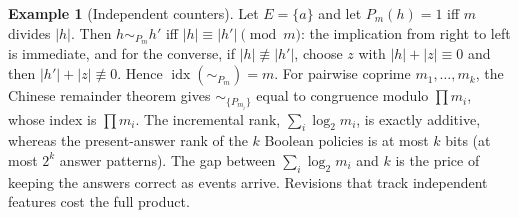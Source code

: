 \documentclass[11pt]{article}
\theoremstyle{definition}
\newtheorem{example}{Example}
\theoremstyle{remark}
\newcommand{\Ev}{E}
\newcommand{\nerode}[1]{\sim_{#1}}
\newcommand{\idx}{\operatorname{idx}}
\begin{document}
\begin{example}[Independent counters]\label{ex:crt}
Let $\Ev=\{a\}$ and let $P_m(h)=1$ iff $m$ divides $|h|$. Then $h\nerode{P_m}h'$ iff $|h|\equiv|h'|\pmod m$: the implication from right to left is immediate, and for the converse, if $|h|\not\equiv|h'|$, choose $z$ with $|h|+|z|\equiv0$ and then $|h'|+|z|\not\equiv0$. Hence $\idx(\nerode{P_m})=m$. For pairwise coprime $m_1,\dots,m_k$, the Chinese remainder theorem gives $\nerode{\{P_{m_i}\}}$ equal to congruence modulo $\prod m_i$, whose index is $\prod m_i$. The incremental rank, $\sum_i\log_2 m_i$, is exactly additive, whereas the present-answer rank of the $k$ Boolean policies is at most $k$ bits (at most $2^k$ answer patterns). The gap between $\sum_i\log_2 m_i$ and $k$ is the price of keeping the answers correct as events arrive. Revisions that track independent features cost the full product.
\end{example}
\end{document}
